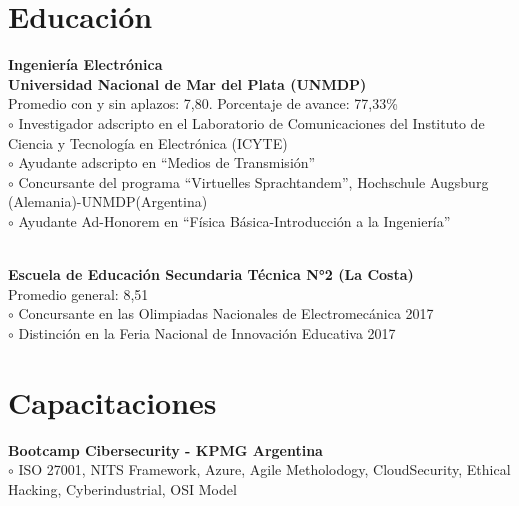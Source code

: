 \documentclass[a4paper,10pt]{article}
\begin{document}
\begin{adjustbox}{valign=t}
\begin{minipage}{0.60\textwidth} %
\section*{Educación}
\begin{description}
\raggedright
\item[	 \textcolor{ColorOne}{2018-2023}] \textbf{Ingeniería Electrónica}\\
	                                      \textbf{Universidad Nacional de Mar del Plata (UNMDP)}\\\Myskip
Promedio con y sin aplazos: 7,80. Porcentaje de avance: 77,33\% \\\Myskip
	     \textcolor{ColorOne}{$\circ$} Investigador adscripto en el Laboratorio de Comunicaciones del Instituto de Ciencia y Tecnología en Electrónica (ICYTE)\\
 \textcolor{ColorOne}{$\circ$} Ayudante adscripto en “Medios de Transmisión” \\
 \textcolor{ColorOne}{$\circ$} Concursante del programa “Virtuelles Sprachtandem”, Hochschule
 Augsburg (Alemania)-UNMDP(Argentina)\\
 \textcolor{ColorOne}{$\circ$} Ayudante Ad-Honorem en “Física Básica-Introducción a la Ingeniería”\\\Myskip
\item[	 \textcolor{ColorOne}{2011-2017} \textbf{Técnico en Electromecánica -}]\\                                          \textbf{Escuela de Educación Secundaria Técnica N°2 (La Costa)}\\\Myskip
	                                    Promedio general: 8,51 \\\Myskip
    \textcolor{ColorOne}{$\circ$} Concursante en las Olimpiadas Nacionales de Electromecánica 2017\\
     \textcolor{ColorOne}{$\circ$} Distinción en la Feria Nacional de Innovación Educativa 2017
\end{description}
\section*{Capacitaciones}
\begin{description}
	\raggedright
	\item[ \textcolor{ColorOne}{Nov.2021}] 
	      \textbf{Bootcamp Cibersecurity - KPMG Argentina}\\ \medskip
     \textcolor{ColorOne}{$\circ$} ISO 27001, NITS Framework, Azure, Agile Metholodogy, CloudSecurity, Ethical Hacking, Cyberindustrial, OSI Model\\	 
\end{description}

\end{minipage}
\end{adjustbox}
\end{document}
